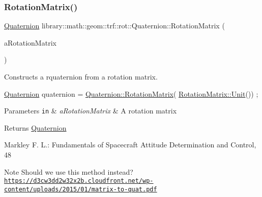 \subsubsection{\texorpdfstring{Rotation\+Matrix()}{RotationMatrix()}}
{\footnotesize\ttfamily \hyperlink{classlibrary_1_1math_1_1geom_1_1trf_1_1rot_1_1_quaternion}{Quaternion} library\+::math\+::geom\+::trf\+::rot\+::\+Quaternion\+::\+Rotation\+Matrix (\begin{DoxyParamCaption}\item[{const \hyperlink{classlibrary_1_1math_1_1geom_1_1trf_1_1rot_1_1_rotation_matrix}{rot\+::\+Rotation\+Matrix} \&}]{a\+Rotation\+Matrix }\end{DoxyParamCaption})\hspace{0.3cm}{\ttfamily [static]}}



Constructs a rquaternion from a rotation matrix. 


\begin{DoxyCode}
\hyperlink{classlibrary_1_1math_1_1geom_1_1trf_1_1rot_1_1_quaternion_aa7f459a08f5af38b9f7676a6bf36a21c}{Quaternion} quaternion = \hyperlink{classlibrary_1_1math_1_1geom_1_1trf_1_1rot_1_1_quaternion_a7e8dbb362e5fe18217724259fde80a03}{Quaternion::RotationMatrix}(
      \hyperlink{classlibrary_1_1math_1_1geom_1_1trf_1_1rot_1_1_rotation_matrix_aac59b7dafc34767d24d0934f4b86bef0}{RotationMatrix::Unit}()) ;
\end{DoxyCode}



\begin{DoxyParams}[1]{Parameters}
\mbox{\tt in}  & {\em a\+Rotation\+Matrix} & A rotation matrix \\
\hline
\end{DoxyParams}
\begin{DoxyReturn}{Returns}
\hyperlink{classlibrary_1_1math_1_1geom_1_1trf_1_1rot_1_1_quaternion}{Quaternion} 
\end{DoxyReturn}
Markley F. L.\+: Fundamentals of Spacecraft Attitude Determination and Control, 48 \begin{DoxyNote}{Note}
Should we use this method instead? \href{https://d3cw3dd2w32x2b.cloudfront.net/wp-content/uploads/2015/01/matrix-to-quat.pdf}{\tt https\+://d3cw3dd2w32x2b.\+cloudfront.\+net/wp-\/content/uploads/2015/01/matrix-\/to-\/quat.\+pdf} 
\end{DoxyNote}
\mbox{\label{classlibrary_1_1math_1_1geom_1_1trf_1_1rot_1_1_quaternion_ad2785ba5b5d632a1953dcd95124e0132}} 
